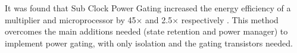 It was found that Sub Clock Power Gating increased the energy efficiency of a multiplier and microprocessor by 45$\times$ and 2.5$\times$ respectively \cite{mistry2011sub}.
This method overcomes the main additions needed (state retention and power manager) to implement power gating, with only isolation and the gating transistors needed. 

%
%
%
%
%
%
%
%
